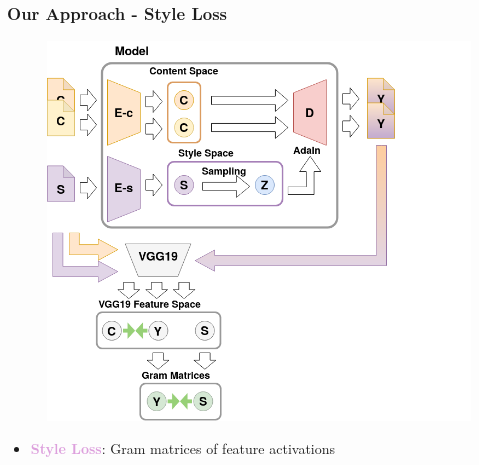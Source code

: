 \documentclass[11pt,xcolor=dvipsnames]{beamer}
\begin{document}
\begin{frame}
  \addtocounter{framenumber}{-1}
\frametitle{Our Approach - Style Loss}
\begin{figure}
\centering
\includegraphics[scale=0.3]{pipelinestyle.png}
\end{figure}


\begin{itemize}
	\item \textcolor{Plum}{\textbf{Style Loss}}: Gram matrices of feature activations
	\vspace{10pt}
\end{itemize}

\end{frame}
\end{document}
